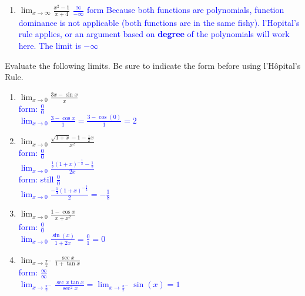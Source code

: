 \documentclass{ximera}
\begin{document}
\begin{exercise}
\begin{enumerate}
{    Because both functions are polynomials, function dominance is not applicable (both functions are in the same fishy).  l'Hopital's rule applies, or an argument based on \textbf{degree} of the polynomials will work here. The limit is $\infty$}
    \item $\lim_{x\rightarrow \infty} \frac{x^2-1}{x+4}$ \textcolor{blue}{ $\frac{\infty}{-\infty}$ form Because both functions are polynomials, function dominance is not applicable (both functions are in the same fishy).  l'Hopital's rule applies, or an argument based on \textbf{degree} of the polynomials will work here. The limit is $-\infty$}
\end{enumerate}   
\end{exercise}
  
\begin{exercise}
Evaluate the following limits.  Be sure to indicate the form before using l'H\^opital's Rule.

\begin{enumerate}
    \item $\displaystyle \lim_{x\rightarrow 0} \frac{3x-\sin x}{x}$\\
    \textcolor{blue}{ form: $\frac{0}{0}$\\
    $\lim_{x\rightarrow 0}\frac{3-\cos x}{1}=\frac{3-\cos(0)}{1}=2$}
   
    \item $\displaystyle \lim_{x\rightarrow 0}\frac{\sqrt{1+x}-1-\frac{1}{2}x}{x^2}$\\
    \textcolor{blue}{ form: $\frac{0}{0}$\\
    $\lim_{x\rightarrow 0} \frac{\frac{1}{2}(1+x)^{-\frac{1}{2}}-\frac{1}{2}}{2x}$\\
    form: still $\frac{0}{0}$\\
    $\lim_{x\rightarrow 0} \frac{-\frac{1}{4}(1+x)^{-\frac{3}{2}}}{2}=-\frac{1}{8}$}

    \item $\displaystyle \lim_{x\rightarrow 0}\frac{1-\cos x}{x+x^2}$\\
     \textcolor{blue}{ form: $\frac{0}{0}$\\
    $\lim_{x\rightarrow 0}\frac{\sin(x)}{1+2x}=\frac{0}{1}=0$}

    \item  $\displaystyle \lim_{x\rightarrow \frac{\pi}{2}^-}\frac{\sec x}{1+\tan x}$\\
      \textcolor{blue}{ form: $\frac{\infty}{\infty}$\\
    $\lim_{x\rightarrow \frac{\pi}{2}^-} \frac{\sec x \tan x}{\sec^2 x}=\lim_{x\rightarrow \frac{\pi}{2}^-} \sin(x)=1$}


\end{enumerate}
\end{exercise}
\end{document}
